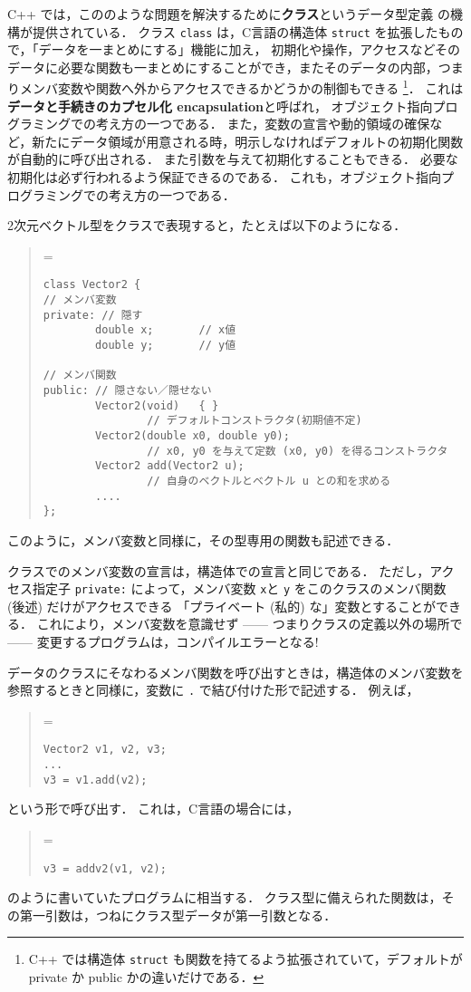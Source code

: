 \documentclass[11pt,a4,epsf]{jarticle}
\def\linesparpage#1{\baselineskip=\textheight\divide\baselineskip#1}
\begin{document}
C++ では，こののような問題を解決するために{\bf クラス}というデータ型定義
の機構が提供されている．
クラス \verb+class+ は，C言語の構造体 \verb+struct+ を拡張したもので，「データを一まとめにする」機能に加え，
初期化や操作，アクセスなどそのデータに必要な関数も一まとめにすることができ，またそのデータの内部，つまりメンバ変数や関数へ外からアクセスできるかどうかの制御もできる
\footnote{ C++ では構造体 {\tt struct} も関数を持てるよう拡張されていて，デフォルトが private か public かの違いだけである．}．
これは{\bf データと手続きのカプセル化 encapsulation}と呼ばれ，
オブジェクト指向プログラミングでの考え方の一つである．
また，変数の宣言や動的領域の確保など，新たにデータ領域が用意される時，明示しなければデフォルトの初期化関数が自動的に呼び出される．
また引数を与えて初期化することもできる．
必要な初期化は必ず行われるよう保証できるのである．
これも，オブジェクト指向プログラミングでの考え方の一つである．

2次元ベクトル型をクラスで表現すると，たとえば以下のようになる．
\begin{quote}
\linesparpage{50}
\begin{verbatim}
class Vector2 {
// メンバ変数
private: // 隠す
        double x;       // x値
        double y;       // y値

// メンバ関数
public: // 隠さない／隠せない
        Vector2(void)   { }
                // デフォルトコンストラクタ(初期値不定)
        Vector2(double x0, double y0);
                // x0, y0 を与えて定数 (x0, y0) を得るコンストラクタ
        Vector2 add(Vector2 u);
                // 自身のベクトルとベクトル u との和を求める
        ....
};
\end{verbatim}
\end{quote}
このように，メンバ変数と同様に，その型専用の関数も記述できる．

クラスでのメンバ変数の宣言は，構造体での宣言と同じである．
ただし，アクセス指定子 \verb+private:+ によって，メンバ変数 \verb+x+と
\verb+y+ をこのクラスのメンバ関数 (後述) だけがアクセスできる
「プライベート (私的) な」変数とすることができる．
これにより，メンバ変数を意識せず ------ 
つまりクラスの定義以外の場所で ------ 変更するプログラムは，コンパイルエラーとなる!

データのクラスにそなわるメンバ関数を呼び出すときは，構造体のメンバ変数を参照するときと同様に，変数に \verb+.+ で結び付けた形で記述する．
例えば，
\begin{quote}
\linesparpage{50}
\begin{verbatim}
Vector2 v1, v2, v3;
...
v3 = v1.add(v2);
\end{verbatim}
\end{quote}
という形で呼び出す．
これは，C言語の場合には，
\begin{quote}
\linesparpage{50}
\begin{verbatim}
v3 = addv2(v1, v2);
\end{verbatim}
\end{quote}
のように書いていたプログラムに相当する．
クラス型に備えられた関数は，その第一引数は，つねにクラス型データが第一引数となる．
\end{document}
